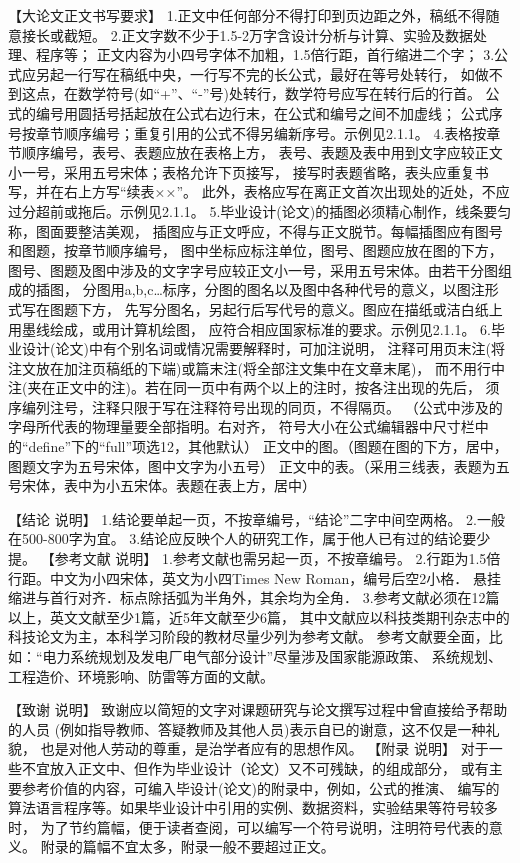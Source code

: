 【大论文正文书写要求】
1.正文中任何部分不得打印到页边距之外，稿纸不得随意接长或截短。
2.正文字数不少于1.5-2万字含设计分析与计算、实验及数据处理、程序等；
正文内容为小四号字体不加粗，1.5倍行距，首行缩进二个字；
3.公式应另起一行写在稿纸中央，一行写不完的长公式，最好在等号处转行，
如做不到这点，在数学符号(如“+”、“-”号)处转行，数学符号应写在转行后的行首。
公式的编号用圆括号括起放在公式右边行末，在公式和编号之间不加虚线；
公式序号按章节顺序编号；重复引用的公式不得另编新序号。示例见2.1.1。
4.表格按章节顺序编号，表号、表题应放在表格上方，
表号、表题及表中用到文字应较正文小一号，采用五号宋体；表格允许下页接写，
接写时表题省略，表头应重复书写，并在右上方写“续表××”。
此外，表格应写在离正文首次出现处的近处，不应过分超前或拖后。示例见2.1.1。
5.毕业设计(论文)的插图必须精心制作，线条要匀称，图面要整洁美观，
插图应与正文呼应，不得与正文脱节。每幅插图应有图号和图题，按章节顺序编号，
图中坐标应标注单位，图号、图题应放在图的下方，
图号、图题及图中涉及的文字字号应较正文小一号，采用五号宋体。由若干分图组成的插图，
分图用a,b,c…标序，分图的图名以及图中各种代号的意义，以图注形式写在图题下方，
先写分图名，另起行后写代号的意义。图应在描纸或洁白纸上用墨线绘成，或用计算机绘图，
应符合相应国家标准的要求。示例见2.1.1。
6.毕业设计(论文)中有个别名词或情况需要解释时，可加注说明，
注释可用页末注(将注文放在加注页稿纸的下端)或篇末注(将全部注文集中在文章末尾)，
而不用行中注(夹在正文中的注)。若在同一页中有两个以上的注时，按各注出现的先后，
须序编列注号，注释只限于写在注释符号出现的同页，不得隔页。
（公式中涉及的字母所代表的物理量要全部指明。右对齐，
符号大小在公式编辑器中尺寸栏中的“define”下的“full”项选12，其他默认）
正文中的图。（图题在图的下方，居中，图题文字为五号宋体，图中文字为小五号）
正文中的表。（采用三线表，表题为五号宋体，表中为小五宋体。表题在表上方，居中）

【结论 说明】
1.结论要单起一页，不按章编号，“结论”二字中间空两格。
2.一般在500-800字为宜。
3.结论应反映个人的研究工作，属于他人已有过的结论要少提。
【参考文献 说明】
1.参考文献也需另起一页，不按章编号。
2.行距为1.5倍行距。中文为小四宋体，英文为小四Times New Roman，编号后空2小格．
悬挂缩进与首行对齐．标点除括弧为半角外，其余均为全角．
3.参考文献必须在12篇以上，英文文献至少1篇，近5年文献至少6篇，
其中文献应以科技类期刊杂志中的科技论文为主，本科学习阶段的教材尽量少列为参考文献。
参考文献要全面，比如：“电力系统规划及发电厂电气部分设计”尽量涉及国家能源政策、
系统规划、工程造价、环境影响、防雷等方面的文献。

【致谢 说明】
致谢应以简短的文字对课题研究与论文撰写过程中曾直接给予帮助的人员
(例如指导教师、答疑教师及其他人员)表示自已的谢意，这不仅是一种礼貌，
也是对他人劳动的尊重，是治学者应有的思想作风。
【附录 说明】
对于一些不宜放入正文中、但作为毕业设计（论文）又不可残缺，的组成部分，
或有主要参考价值的内容，可编入毕设计(论文)的附录中，例如，公式的推演、
编写的算法语言程序等。如果毕业设计中引用的实例、数据资料，实验结果等符号较多时，
为了节约篇幅，便于读者查阅，可以编写一个符号说明，注明符号代表的意义。
附录的篇幅不宜太多，附录一般不要超过正文。



